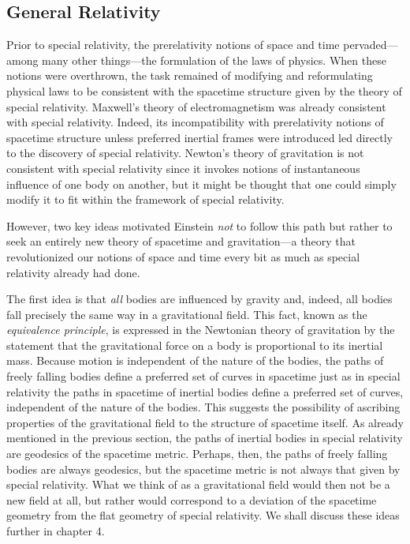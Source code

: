 
\subsection{General Relativity}\label{sec:1.4}

Prior to special relativity, the prerelativity notions of space and time
pervaded---among many other things---the formulation of the laws of physics. When
these notions were overthrown, the task remained of modifying and reformulating
physical laws to be consistent with the spacetime structure given by the theory of
special relativity. Maxwell's theory of electromagnetism was already consistent with
special relativity. Indeed, its incompatibility with prerelativity notions of spacetime
structure unless preferred inertial frames were introduced led directly to the discovery
of special relativity. Newton's theory of gravitation is not consistent with special
relativity since it invokes notions of instantaneous influence of one body on another,
but it might be thought that one could simply modify it to fit within the framework of
special relativity.

However, two key ideas motivated Einstein \emph{not} to follow this path but rather to
seek an entirely new theory of spacetime and gravitation---a theory that revolutionized
our notions of space and time every bit as much as special relativity already had done.

The first idea is that \emph{all} bodies are influenced by gravity and, indeed, all
bodies fall precisely the same way in a gravitational field. This fact, known as the
\emph{equivalence principle}, is expressed in the Newtonian theory of gravitation by
the statement that the gravitational force on a body is proportional to its inertial mass.
Because motion is independent of the nature of the bodies, the paths of freely falling
bodies define a preferred set of curves in spacetime just as in special relativity the
paths in spacetime of inertial bodies define a preferred set of curves, independent of
the nature of the bodies. This suggests the possibility of ascribing properties of the
gravitational field to the structure of spacetime itself. As already mentioned in the
previous section, the paths of inertial bodies in special relativity are geodesics of the
spacetime metric. Perhaps, then, the paths of freely falling bodies are always
geodesics, but the spacetime metric is not always that given by special relativity. What
we think of as a gravitational field would then not be a new field at all, but rather
would correspond to a deviation of the spacetime geometry from the flat geometry of
special relativity. We shall discuss these ideas further in chapter 4.

